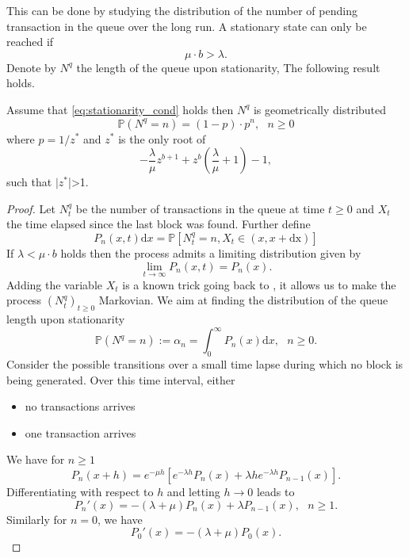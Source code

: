 This can be done by studying the distribution of the number of pending transaction in the queue over the long run. A stationary state can only be reached if 
\begin{equation}\label{eq:stationarity_cond}
\mu \cdot b > \lambda.
\end{equation}
Denote by $N^q$ the length of the queue upon stationarity, The following result holds.
\begin{theo}
Assume that \eqref{eq:stationarity_cond} holds then $N^q$ is geometrically distributed 
$$
\mathbb{P}(N^q = n) = (1-p)\cdot p^n,\text{ } n\geq0
$$
where $p = 1/z^\ast$ and $z^\ast$ is the only root of 
$$
-\frac{\lambda}{\mu}z^{b+1}+z^b\left(\frac{\lambda}{\mu}+1\right) - 1,
$$
such that $|z^\ast$|>1.  
\end{theo}
\begin{proof}
Let $N^q_t$ be the number of transactions in the queue at time $t\geq0$ and $X_t$ the time elapsed since the last block was found. Further define
\[
P_{n}(x,t)\text{d}x  =\mathbb{P}[N_t^q = n, X_t \in(x, x + \text{dx})] 
\]
If $\lambda < \mu\cdot b$ holds then the process admits a limiting distribution given by 
\[
\underset{t\rightarrow\infty}{\lim}P_{n}(x,t) = P_{n}(x).
\]
Adding the variable $X_t$ is a known trick going back to \citet{Cox1955}, it allows us to make the process $(N_t^q)_{t\geq0}$ Markovian. We aim at finding the distribution of the queue length upon stationarity
\begin{equation}\label{eq:alpha_n}
\mathbb{P}(N^q=n):=\alpha_n =\int_{0}^\infty P_{n}(x)\text{d}x, \text{ }n\geq0.
\end{equation}
Consider the possible transitions over a small time lapse  during which no block is being generated. Over this time interval, either 
\begin{itemize}
  \item no transactions arrives
  \item one transaction arrives
\end{itemize}
We have for $n\geq1$
\[
P_{n}(x+h) = e^{-\mu h}\left[e^{-\lambda h}P_{n}(x)+\lambda h e^{-\lambda h}P_{n-1}(x)\right].
\]
Differentiating with respect to $h$ and letting $h\rightarrow0$ leads to 
\begin{equation}\label{eq:diff_eq_n_geq_1}
P_{n}'(x) = -(\lambda+\mu)P_{n}(x)+\lambda P_{n-1}(x),\text{ }n \geq1.
\end{equation}
Similarly for $n = 0$, we have 
\begin{equation}\label{eq:diff_eq_n_eq_0}
P_{0}'(x) = -(\lambda+\mu)P_{0}(x).

\end{equation}
\end{proof}
